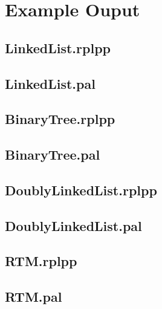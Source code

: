 \chapter{Example Ouput}
\label{app:example-output}

\section*{LinkedList.rplpp}
% 

\newpage
\section*{LinkedList.pal}
% 

\newpage
\section*{BinaryTree.rplpp}
% 

\newpage
\section*{BinaryTree.pal}
% 

\newpage
\section*{DoublyLinkedList.rplpp}
% 

\newpage
\section*{DoublyLinkedList.pal}
%    

\newpage
\section*{RTM.rplpp}
% 

\newpage
\section*{RTM.pal}
%  
